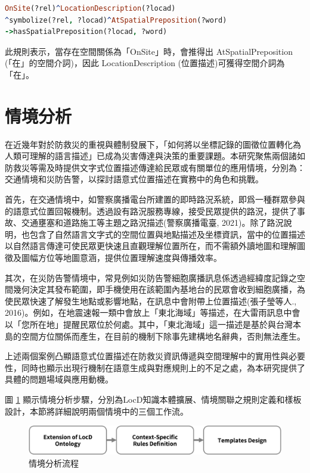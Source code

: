 \begin{lstlisting}[language=Prolog, basicstyle=\ttfamily, xleftmargin=2em]
OnSite(?rel)^LocationDescription(?locad)
^symbolize(?rel, ?locad)^AtSpatialPreposition(?word)
->hasSpatialPreposition(?locad, ?word)
\end{lstlisting}

此規則表示，當存在空間關係為「OnSite」時，會推得出 AtSpatialPreposition (「在」的空間介詞)，因此 LocationDescription (位置描述)可獲得空間介詞為「在」。

\section{情境分析}

在近幾年對於防救災的重視與體制發展下，「如何將以坐標記錄的圖徵位置轉化為人類可理解的語言描述」已成為災害傳達與決策的重要課題。本研究聚焦兩個諸如防救災等需及時提供文字式位置描述傳達給民眾或有關單位的應用情境，分別為：交通情境和災防告警，以探討語意式位置描述在實務中的角色和挑戰。

首先，在交通情境中，如警察廣播電台所建置的即時路況系統，即爲一種群眾參與的語意式位置回報機制。透過設有路況服務專線，接受民眾提供的路況，提供了事故、交通壅塞和道路施工等主題之路況描述(警察廣播電臺, 2021)。除了路況說明，也包含了自然語言文字式的空間位置與地點描述及坐標資訊，當中的位置描述以自然語言傳達可使民眾更快速且直觀理解位置所在，而不需額外讀地圖和理解圖徵及圖幅方位等地圖意涵，提供位置理解速度與傳播效率。

其次，在災防告警情境中，常見例如災防告警細胞廣播訊息係透過經緯度記錄之空間幾何決定其發布範圍，即手機使用在該範圍內基地台的民眾會收到細胞廣播，為使民眾快速了解發生地點或影響地點，在訊息中會附帶上位置描述(張子瑩等人., 2016)。例如，在地震速報一類中會放上「東北海域」等描述，在大雷雨訊息中會以「您所在地」提醒民眾位於何處。其中，「東北海域」這一描述是基於與台灣本島的空間方位關係而產生，在目前的機制下除事先建構地名辭典，否則無法產生。

上述兩個案例凸顯語意式位置描述在防救災資訊傳遞與空間理解中的實用性與必要性，同時也顯示出現行機制在語意生成與對應規則上的不足之處，為本研究提供了具體的問題場域與應用動機。

圖 \ref{fig:context_steps} 顯示情境分析步驟，分別為LocD知識本體擴展、情境關聯之規則定義和樣板設計，本節將詳細說明兩個情境中的三個工作流。

\begin{figure}[!htbp]
\centering
\includegraphics[width = \textwidth]{figures/conext_steps.png}
\caption{情境分析流程}
\label{fig:context_steps}
\end{figure}

